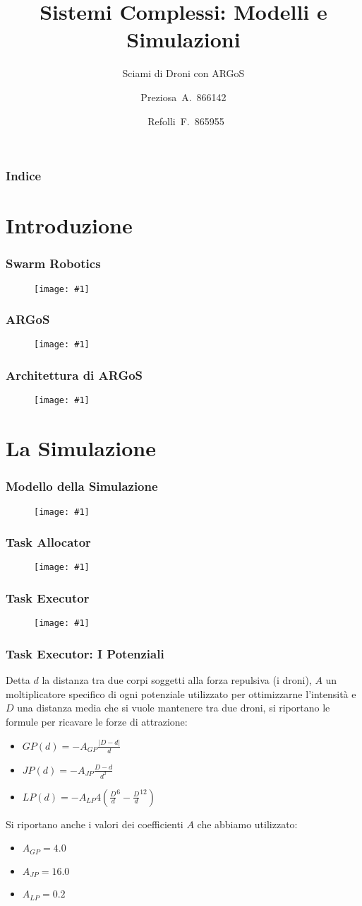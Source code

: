 \documentclass{beamer}
\title{Sistemi Complessi: Modelli e Simulazioni}
\subtitle{Sciami di Droni con ARGoS}
\author{Preziosa~A.~866142 \and ~Refolli~F.~865955}
\newcommand{\putimage}[2] {
  \begin{figure}
    \centering
    \texttt{[image: \#1]}
	\end{figure}
}
\begin{document}
\frame{\titlepage}

\begin{frame}
\frametitle{Indice}
\tableofcontents
\end{frame}

\section{Introduzione}

\begin{frame}
\frametitle{Swarm Robotics}
  \putimage{images/swarm\_robotics.JPG}{0.9}
\end{frame}

\begin{frame}
\frametitle{ARGoS}
\putimage{images/argos3.png}{0.9}
\end{frame}

\begin{frame}
\frametitle{Architettura di ARGoS}
\putimage{images/architecture.png}{0.9}
\end{frame}

\section{La Simulazione}

\begin{frame}
\frametitle{Modello della Simulazione}
\putimage{images/simulation-model.png}{0.9}
\end{frame}

\begin{frame}
\frametitle{Task Allocator}
\putimage{images/task-allocator.png}{0.9}
\end{frame}

\begin{frame}
\frametitle{Task Executor}
\putimage{images/task-executor.png}{0.9}
\end{frame}

\begin{frame}
\frametitle{Task Executor: I Potenziali}
Detta $d$ la distanza tra due corpi soggetti alla forza repulsiva (i droni), $A$ un moltiplicatore specifico di ogni potenziale utilizzato per ottimizzarne l'intensit\`a e $D$ una distanza media che si vuole mantenere tra due droni, si riportano le formule per ricavare le forze di attrazione:

\begin{itemize}
  \item $GP(d) = -A_{GP} \frac {|D - d|} {d}$
  \item $JP(d) = -A_{JP} \frac {D - d} {d^2}$
  \item $LP(d) = -A_{LP} 4 ({\frac {D} {d}}^6 - {\frac {D} {d}}^{12})$
\end{itemize}

Si riportano anche i valori dei coefficienti $A$ che abbiamo utilizzato:

\begin{itemize}
  \item $A_{GP} = 4.0$
  \item $A_{JP} = 16.0$
  \item $A_{LP} = 0.2$
\end{itemize}
\end{frame}
\end{document}
